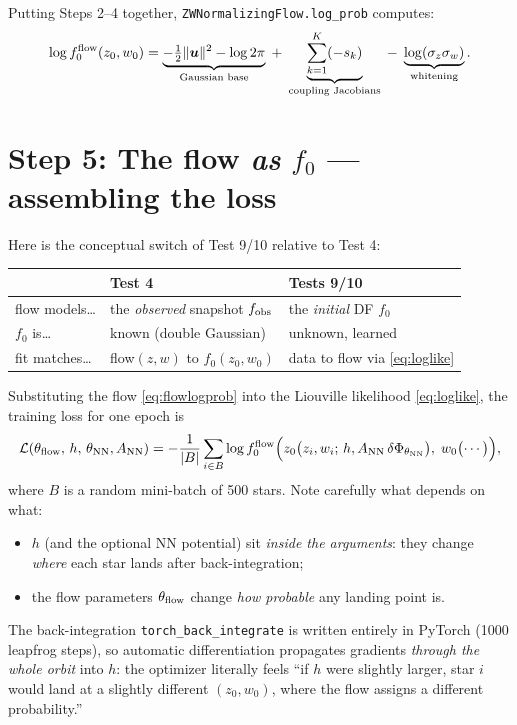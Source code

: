 \documentclass[11pt]{article}
\begin{document}
Putting Steps 2--4 together, \texttt{ZWNormalizingFlow.log\_prob} computes:
\begin{equation}
\log f_0^{\rm flow}(z_0,w_0)
= \underbrace{-\tfrac12\|\bm u\|^2 - \log 2\pi}_{\text{Gaussian base}}
\;+\; \underbrace{\sum_{k=1}^{K} (-s_k)}_{\text{coupling Jacobians}}
\;-\; \underbrace{\log(\sigma_z\sigma_w)}_{\text{whitening}} .
\label{eq:flowlogprob}
\end{equation}

\section{Step 5: The flow \emph{as} $f_0$ --- assembling the loss}

Here is the conceptual switch of Test 9/10 relative to Test 4:

\begin{center}
\begin{tabular}{l|l|l}
 & \textbf{Test 4} & \textbf{Tests 9/10} \\ \hline
flow models\dots & the \emph{observed} snapshot $f_{\rm obs}$ & the \emph{initial} DF $f_0$ \\
$f_0$ is\dots & known (double Gaussian) & unknown, learned \\
fit matches\dots & flow$(z,w)$ to $f_0(z_0,w_0)$ & data to flow via \eqref{eq:loglike} \\
\end{tabular}
\end{center}

Substituting the flow \eqref{eq:flowlogprob} into the Liouville likelihood
\eqref{eq:loglike}, the training loss for one epoch is
\begin{equation}
\mathcal{L}(\theta_{\rm flow},\, h,\, \theta_{\rm NN}, A_{\rm NN})
= -\frac{1}{|B|}\sum_{i\in B}
   \log f_0^{\rm flow}\Bigl(
      z_0\bigl(z_i,w_i;\, h, A_{\rm NN}\,\delta\Phi_{\theta_{\rm NN}}\bigr),\;
      w_0\bigl(\cdots\bigr)
   \Bigr),
\label{eq:loss}
\end{equation}
where $B$ is a random mini-batch of 500 stars. Note carefully what depends on what:
\begin{itemize}
\item $h$ (and the optional NN potential) sit \emph{inside the arguments}: they change
      \emph{where} each star lands after back-integration;
\item the flow parameters $\theta_{\rm flow}$ change \emph{how probable} any landing
      point is.
\end{itemize}
The back-integration \texttt{torch\_back\_integrate} is written entirely in PyTorch
(1000 leapfrog steps), so automatic differentiation propagates gradients \emph{through
the whole orbit} into $h$: the optimizer literally feels ``if $h$ were slightly
larger, star $i$ would land at a slightly different $(z_0,w_0)$, where the flow
assigns a different probability.''
\end{document}
